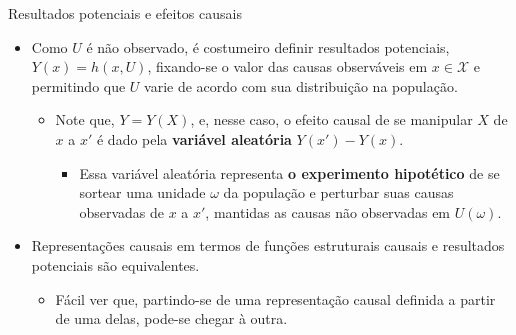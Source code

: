 \documentclass[11pt]{beamer}
\begin{document}
\begin{frame}{Resultados potenciais e efeitos causais}
\begin{itemize}
\item Como $U$ é não observado, é costumeiro definir  {\color{blue}resultados potenciais}, $Y(x)=h(x,U)$, fixando-se o valor das causas observáveis em $x \in \mathcal{X}$ e permitindo que $U$ varie de acordo com sua distribuição na população.
	\begin{itemize}
		\item Note que, $Y = Y(X)$, e, nesse caso, o efeito causal de se manipular $X$ de $x$ a $x'$ é dado pela \textbf{variável aleatória} $Y(x')-Y(x)$.
		\begin{itemize}
			\item Essa variável aleatória representa \textbf{o experimento hipotético} de se sortear uma unidade $\omega$ da população e perturbar suas causas observadas de $x$ a $x'$, mantidas as causas não observadas em $U(\omega)$.
		\end{itemize}
	\end{itemize} 
	\item Representações causais em termos de funções estruturais causais e resultados potenciais são {\color{blue}equivalentes}.
	\begin{itemize}
		\item Fácil ver que, partindo-se de uma representação causal definida a partir de uma delas, pode-se chegar à outra.
	\end{itemize}
\end{itemize}
\end{frame}
\end{document}
